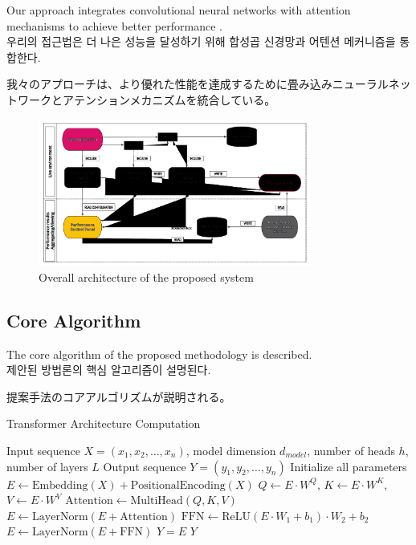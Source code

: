 \documentclass[preprint,12pt]{elsarticle}
\begin{document}
Our approach integrates convolutional neural networks with attention mechanisms to achieve better performance \cite{vaswani2017attention}. \\
우리의 접근법은 더 나은 성능을 달성하기 위해 합성곱 신경망과 어텐션 메커니즘을 통합한다. \\
\begin{CJK}{UTF8}{min}
我々のアプローチは、より優れた性能を達成するために畳み込みニューラルネットワークとアテンションメカニズムを統合している。
\end{CJK}

\begin{figure}[htbp]
    \centering
    \includegraphics[width=0.8\textwidth]{figures/System-overview-Atomia-Performance-Monitoring-system.png}
    \caption{Overall architecture of the proposed system}
    \label{fig:system_overview}
\end{figure}

\subsection{Core Algorithm}
The core algorithm of the proposed methodology is described. \\
제안된 방법론의 핵심 알고리즘이 설명된다. \\
\begin{CJK}{UTF8}{min}
提案手法のコアアルゴリズムが説明される。
\end{CJK}

\begin{algorithm}
\caption{Transformer Architecture Computation}
\label{alg:transformer}
\begin{algorithmic}[1]
\REQUIRE Input sequence $X = (x_1, x_2, \ldots, x_n)$, model dimension $d_{model}$, number of heads $h$, number of layers $L$
\ENSURE Output sequence $Y = (y_1, y_2, \ldots, y_n)$
\STATE Initialize all parameters
\STATE $E \leftarrow \text{Embedding}(X) + \text{PositionalEncoding}(X)$
    \STATE $Q \leftarrow E \cdot W^Q$, $K \leftarrow E \cdot W^K$, $V \leftarrow E \cdot W^V$
    \STATE $\text{Attention} \leftarrow \text{MultiHead}(Q, K, V)$
    \STATE $E \leftarrow \text{LayerNorm}(E + \text{Attention})$
    \STATE $\text{FFN} \leftarrow \text{ReLU}(E \cdot W_1 + b_1) \cdot W_2 + b_2$
    \STATE $E \leftarrow \text{LayerNorm}(E + \text{FFN})$
\ENDFOR
\STATE $Y = E$ 
\RETURN $Y$
\end{algorithmic}
\end{algorithm}
\end{document}
